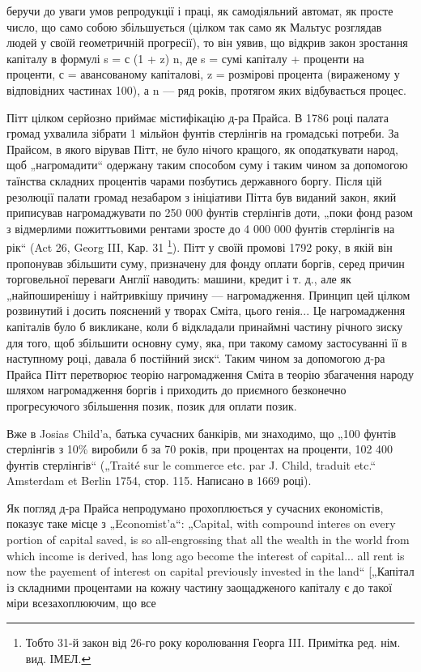 \parcont{}  %
беручи до уваги умов репродукції і праці, як самодіяльний
автомат, як просте число, що само собою збільшується (цілком
так само як Мальтус розглядав людей у своїй геометричній
прогресії), то він уявив, що відкрив закон зростання капіталу
в формулі s = с (1 + z) n, де s = сумі капіталу + проценти на
проценти, с = авансованому капіталові, z = розмірові процента
(вираженому у відповідних частинах 100), а n — ряд років, протягом
яких відбувається процес.

Пітт цілком серйозно приймає містифікацію д-ра Прайса.
В 1786 році палата громад ухвалила зібрати 1 мільйон фунтів стерлінгів
на громадські потреби. За Прайсом, в якого вірував Пітт,
не було нічого кращого, як оподаткувати народ, щоб „нагромадити“
одержану таким способом суму і таким чином за допомогою
таїнства складних процентів чарами позбутись державного
боргу. Після цій резолюції палати громад незабаром з ініціативи
Пітта був виданий закон, який приписував нагромаджувати по
250 000 фунтів стерлінгів доти, „поки фонд разом з відмерлими
пожиттьовими рентами зросте до 4 000 000 фунтів стерлінгів
на рік“ (Act 26, Georg III, Кар. 31 \footnote*{
Тобто 31-й закон від 26-го року королювання Георга III. Примітка ред.
нім. вид. ІМЕЛ.
}). Пітт у своїй промові 1792 року,
в якій він пропонував збільшити суму, призначену для фонду
оплати боргів, серед причин торговельної переваги Англії наводить:
машини, кредит і т. д., але як „найпоширенішу і найтривкішу
причину — нагромадження. Принцип цей цілком розвинутий
і досить пояснений у творах Сміта, цього генія... Це нагромадження
капіталів було б викликане, коли б відкладали принаймні
частину річного зиску для того, щоб збільшити основну
суму, яка, при такому самому застосуванні її в наступному році,
давала б постійний зиск“. Таким чином за допомогою д-ра Прайса
Пітт перетворює теорію нагромадження Сміта в теорію збагачення
народу шляхом нагромадження боргів і приходить до
приємного безконечно прогресуючого збільшення позик, позик
для оплати позик.

Вже в Josias Child’a, батька сучасних банкірів, ми знаходимо,
що „100 фунтів стерлінгів з 10\% виробили б за 70 років, при
процентах на проценти, 102 400 фунтів стерлінгів“ („Traité sur le
commerce etc. par J. Child, traduit etc.“ Amsterdam et Berlin
1754, стор. 115. Написано в 1669 році).

Як погляд д-ра Прайса непродумано прохоплюється у сучасних
економістів, показує таке місце з „Economist’a“: „Capital,
with compound interes on every portion of capital saved, is so
all-engrossing that all the wealth in the world from which income
is derived, has long ago become the interest of capital... all rent is
now the payement of interest on capital previously invested in the
land“ [„Капітал із складними процентами на кожну частину заощадженого
капіталу є до такої міри всезахоплюючим, що все
\parbreak{}  %
